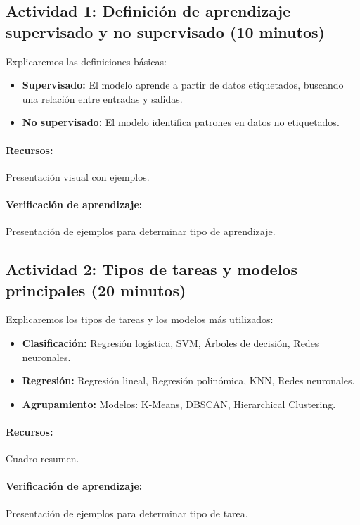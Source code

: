 \documentclass[a4,11pt]{aleph-notas}
\begin{document}
\subsection*{Actividad 1: Definición de aprendizaje supervisado y no supervisado (10 minutos)}  
Explicaremos las definiciones básicas:
\begin{itemize}
    \item \textbf{Supervisado:} El modelo aprende a partir de datos etiquetados, buscando una relación entre entradas y salidas. 
    \item \textbf{No supervisado:} El modelo identifica patrones en datos no etiquetados. 
\end{itemize}

\paragraph{Recursos:} Presentación visual con ejemplos.  

\paragraph{Verificación de aprendizaje:} Presentación de ejemplos para determinar tipo de aprendizaje.

\subsection*{Actividad 2: Tipos de tareas y modelos principales  (20 minutos)}  
Explicaremos los tipos de tareas y los modelos más utilizados:
\begin{itemize}
    \item \textbf{Clasificación:} Regresión logística, SVM, Árboles de decisión, Redes neuronales.
    \item \textbf{Regresión:} Regresión lineal, Regresión polinómica, KNN, Redes neuronales.
    \item \textbf{Agrupamiento:} Modelos: K-Means, DBSCAN, Hierarchical Clustering.
\end{itemize}

\paragraph{Recursos:} Cuadro resumen.  

\paragraph{Verificación de aprendizaje:} Presentación de ejemplos para determinar tipo de tarea.
\end{document}
